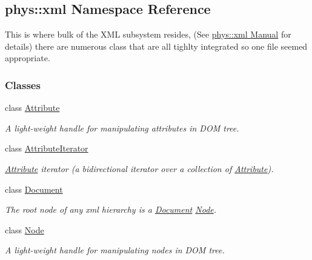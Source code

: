 \hypertarget{namespacephys_1_1xml}{
\subsection{phys::xml Namespace Reference}
\label{namespacephys_1_1xml}
}


This is where bulk of the XML subsystem resides, (See \hyperlink{XMLManual}{phys::xml Manual} for details) there are numerous class that are all tighlty integrated so one file seemed appropriate.  


\subsubsection*{Classes}
\begin{DoxyCompactItemize}
\item 
class \hyperlink{classphys_1_1xml_1_1Attribute}{Attribute}
\begin{DoxyCompactList}\small\item\em A light-\/weight handle for manipulating attributes in DOM tree. \item\end{DoxyCompactList}\item 
class \hyperlink{classphys_1_1xml_1_1AttributeIterator}{AttributeIterator}
\begin{DoxyCompactList}\small\item\em \hyperlink{classphys_1_1xml_1_1Attribute}{Attribute} iterator (a bidirectional iterator over a collection of \hyperlink{classphys_1_1xml_1_1Attribute}{Attribute}). \item\end{DoxyCompactList}\item 
class \hyperlink{classphys_1_1xml_1_1Document}{Document}
\begin{DoxyCompactList}\small\item\em The root node of any xml hierarchy is a \hyperlink{classphys_1_1xml_1_1Document}{Document} \hyperlink{classphys_1_1xml_1_1Node}{Node}. \item\end{DoxyCompactList}\item 
class \hyperlink{classphys_1_1xml_1_1Node}{Node}
\begin{DoxyCompactList}\small\item\em A light-\/weight handle for manipulating nodes in DOM tree. \item\end{DoxyCompactList}\item 

\end{DoxyCompactItemize}
